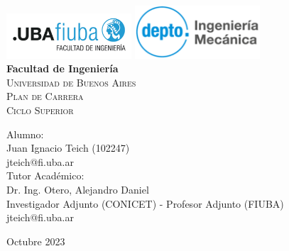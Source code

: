 \documentclass{article}
\newcommand{\thetitle}{Plan de Carrera\\ Ciclo Superior}
\newcommand{\theauthorJT}{Juan Ignacio Teich}
\newcommand{\thedate}{Octubre 2023}
\numberwithin{equation}{subsection}
\begin{document}

\begin{titlepage}
    \begin{center}
    \includegraphics[width=0.35\textwidth]{Logo-fiuba-2.png} \hfill \includegraphics[width=0.35\textwidth]{depto.png}\\
    \vspace{1cm}
    {\bfseries \LARGE Facultad de Ingeniería}\\
    \vspace{0.5cm}
    {\scshape \Large Universidad de Buenos Aires}\\
    \vspace{3cm}
    {\scshape \Huge \thetitle}\\
    \end{center}
    \vfill
    {\Large Alumno:\\[10pt] \indent\theauthorJT\; (102247)\\[10pt] \indent jteich@fi.uba.ar}\\[20pt]
    {\Large Tutor Académico:\\[10pt] \indent Dr. Ing. Otero, Alejandro Daniel\\[10pt] \indent Investigador Adjunto (CONICET) - Profesor Adjunto (FIUBA) \\[10pt] \indent jteich@fi.uba.ar}\\
    \vfill
    \begin{center}
		{\large \thedate}
    \end{center}
\end{titlepage}
\end{document}

